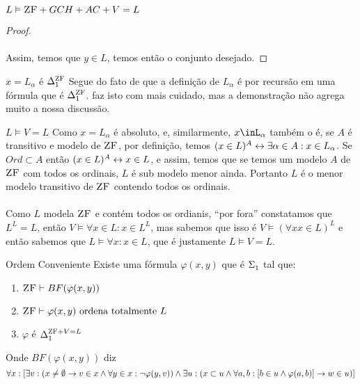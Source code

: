 \begin{theorem}{$L\vDash\text{\sc ZF}+GCH+AC+V=L$}
\begin{proof}
                \paragraph{}
                    Assim, temos que $y\in L$, temos então o conjunto desejado.
                \eop
            \end{proof}
            \begin{lemma}{$x=L_\alpha$ é $\Delta^{\text{\sc ZF}}_{1}$}
                Segue do fato de que a definição de $L_\alpha$ é por recursão em uma fórmula que é $\Delta^{\text{\sc ZF}}_{1}$. \cite{Drake} faz isto 
                com mais cuidado, mas a demonstração não agrega muito a nossa discussão.
            \end{lemma}
            \begin{theorem}{$L\vDash V = L$}
                    Como $x = L_\alpha$ é absoluto, e, similarmente, $x\inL_\alpha$ também o é, se $A$ é transitivo e modelo de $\text{\sc ZF}$, por 
                    definição, temos $(x\in L)^A\leftrightarrow\exists\alpha\in A:x\in L_\alpha$. Se $Ord\subset A$ então $(x\in L)^A\leftrightarrow x\in L$, e 
                    assim, temos que se temos um modelo $A$ de $\text{\sc ZF}$ com todos os ordinais, $L$ é sub modelo menor ainda. Portanto $L$ é 
                    o menor modelo transitivo de $\text{\sc ZF}$ contendo todos os ordinais.
                \paragraph{} 
                    Como $L$ modela $\text{\sc ZF}$ e contém todos os ordianis, ``por fora'' constatamos que $L^L = L$, então 
                    $V\vDash \forall x\in L: x\in L^L$, mas sabemos que isso é $V\vDash(\forall x x\in L)^L$ e então
                    sabemos que $L\vDash\forall x: x\in L$, que é justamente $L\vDash V=L$.
            \end{theorem}
            \begin{lemma}{Ordem Conveniente}
                Existe uma fórmula $\varphi(x,y)$ que é $\Sigma^{}_{1}$ tal que:
                \begin{enumerate}
                    \item $\text{\sc ZF}\vdash BF(\varphi(x,y))$
                    \item $\text{\sc ZF}\vdash\varphi(x,y)\text{ ordena totalmente }L$
                    \item $\varphi$ é $\Delta^{\text{\sc ZF}+V=L}_{1}$
                \end{enumerate} 
                Onde $BF(\varphi(x,y))$ diz 
                $$\forall x:[\exists v:(x\not = \emptyset \rightarrow v\in x \land \forall y\in x: \neg \varphi(y,v) )\land \exists u:(x\subset u\land \forall a,b: [b\in u \land \varphi(a,b)]\rightarrow w\in u)]$$

\end{lemma}
\end{theorem}
